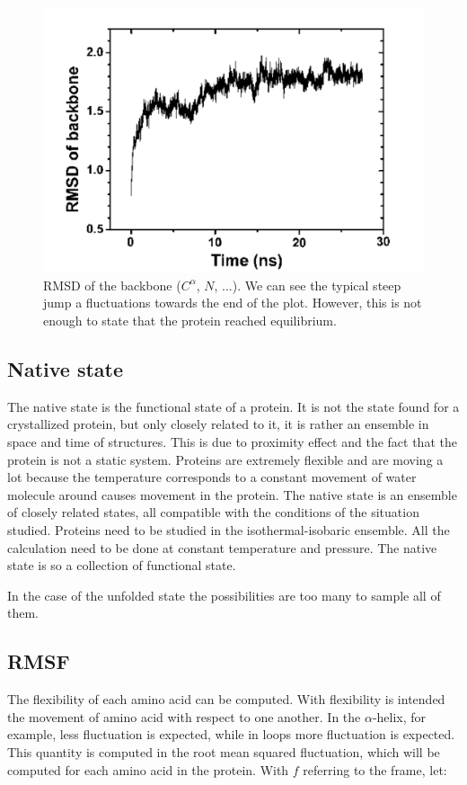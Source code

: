 		\begin{figure}[H]
			\centering
			\includegraphics[width=\textwidth]{rmsd.png}
			\caption{RMSD of the backbone ($C^{\alpha}$, $N$, ...). We can see the typical steep jump a fluctuations towards the end of the plot. However, this is not enough to state that the protein reached equilibrium.}
			\label{fig:rmsd}
			\end{figure}


	\subsection{Native state}
	The native state is the functional state of a protein.
	It is not the state found for a crystallized protein, but only closely related to it, it is rather an ensemble in space and time of structures.
	This is due to proximity effect and the fact that the protein is not a static system.
	Proteins are extremely flexible and are moving a lot because the temperature corresponds to a constant movement of water molecule around causes movement in the protein.
	The native state is an ensemble of closely related states, all compatible with the conditions of the situation studied.
	Proteins need to be studied in the isothermal-isobaric ensemble.
	All the calculation need to be done at constant temperature and pressure.
	The native state is so a collection of functional state.

	In the case of the unfolded state the possibilities are too many to sample all of them.

	\subsection{RMSF}
	The flexibility of each amino acid can be computed.
	With flexibility is intended the movement of amino acid with respect to one another.
	In the $\alpha$-helix, for example, less fluctuation is expected, while in loops more fluctuation is expected.
	This quantity is computed in the root mean squared fluctuation, which will be computed for each amino acid in the protein.
	With $f$ referring to the frame, let:


